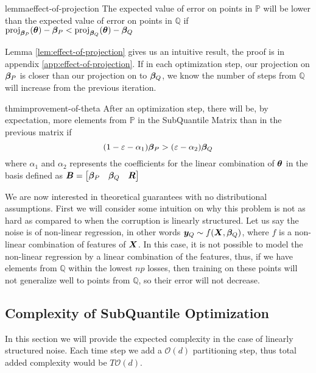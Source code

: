 \documentclass{article} %
\DeclareMathOperator{\proj}{proj}
\begin{document}
	\begin{restatable}{lemma}{effect-of-projection}
		\label{lem:effect-of-projection}
		The expected value of error on points in $\mathbb{P}$ will be lower than the expected value of error on points in $\mathbb{Q}$ if $\proj_{\vbeta_P}(\vtheta) - \vbeta_P < \proj_{\vbeta_Q}(\vtheta) - \vbeta_Q$
	\end{restatable}
	
	Lemma \ref{lem:effect-of-projection} gives us an intuitive result, the proof is in appendix \ref{app:effect-of-projection}. If in each optimization step, our projection on ${\bm{\beta}}_P$ is closer than our projection on to ${\bm{\beta}}_Q$, we know the number of steps from $\mathbb{Q}$ will increase from the previous iteration.
	\begin{restatable}{thm}{improvement-of-theta}
		\label{thm:improvement-of-theta}
		After an optimization step, there will be, by expectation, more elements from $\mathbb{P}$ in the SubQuantile Matrix than in the previous matrix if \begin{equation}
			(1-\varepsilon - \alpha_1){\bm{\beta}}_P > (\varepsilon - \alpha_2){\bm{\beta}}_Q
		\end{equation}
		where $\alpha_1$ and $\alpha_2$ represents the coefficients for the linear combination of ${\bm{\theta}}$ in the basis defined as ${\bm{B}} = \begin{bmatrix} {\bm{\beta}}_P & {\bm{\beta}}_Q & {\bm{R}}\end{bmatrix}$
	\end{restatable}
	
	We are now interested in theoretical guarantees with no distributional assumptions. First we will consider some intuition on why this problem is not as hard as compared to when the corruption is linearly structured. Let us say the noise is of non-linear regression, in other words ${\bm{y}}_Q \sim f({\bm{X}},{\bm{\beta}}_Q)$, where $f$ is a non-linear combination of features of ${\bm{X}}$. In this case, it is not possible to model the non-linear regression by a linear combination of the features, thus, if we have elements from $\mathbb{Q}$ within the lowest $np$ losses, then training on these points will not generalize well to points from $\mathbb{Q}$, so their error will not decrease. 
	
	\subsection{Complexity of SubQuantile Optimization}
	In this section we will provide the expected complexity in the case of linearly structured noise. Each time step we add a $\mathcal{O}(d)$ partitioning step, thus total added complexity would be $T\mathcal{O}(d)$. 
	
\end{document}
